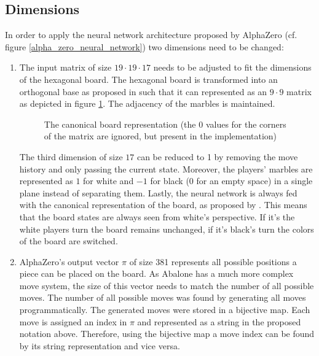 \subsection{Dimensions}
In order to apply the neural network architecture proposed by AlphaZero (cf. figure \ref{alpha_zero_neural_network}) two dimensions need to be changed:
\begin{enumerate}
    \item The input matrix of size $19 \cdot 19 \cdot 17$ needs to be adjusted to fit the dimensions of the hexagonal board. The hexagonal board is transformed into an orthogonal base as proposed in \cite{towzeur_towzeurgym-abalone_2021} such that it can represented as an $9 \cdot 9$ matrix as depicted in figure \ref{input_matrix}. The adjacency of the marbles is maintained.
          \begin{figure}[!h]
              \centering
              \hfill
              \caption{The canonical board representation (the $0$ values for the corners of the matrix are ignored, but present in the implementation)}
              \label{input_matrix}
          \end{figure}
          The third dimension of size $17$ can be reduced to 1 by removing the move history and only passing the current state. Moreover, the players' marbles are represented as $1$ for white and $-1$ for black (0 for an empty space) in a single plane instead of separating them. Lastly, the neural network is always fed with the canonical representation of the board, as proposed by \cite{thakoor_learning_nodate}. This means that the board states are always seen from white's perspective. If it's the white players turn the board remains unchanged, if it's black's turn the colors of the board are switched.

    \item AlphaZero's output vector $\pi$ of size 381 represents all possible positions a piece can be placed on the board. As Abalone has a much more complex move system, the size of this vector needs to match the number of all possible moves. The number of all possible moves was found by generating all moves programmatically. The generated moves were stored in a bijective map. Each move is assigned an index in $\pi$ and represented as a string in the proposed notation above. Therefore, using the bijective map a move index can be found by its string representation and vice versa.


\end{enumerate}

